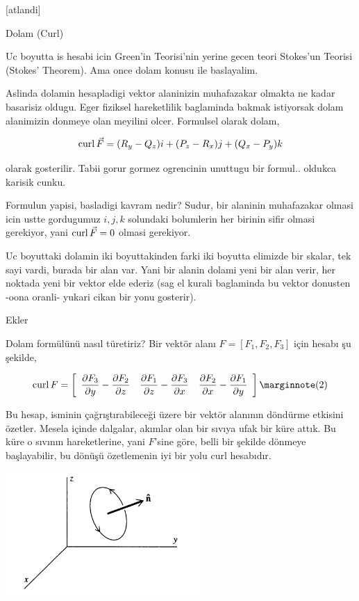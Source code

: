 \documentclass[12pt,fleqn]{article}\usepackage{../../common}
\begin{document}
[atlandi]

Dolam (Curl)

Uc boyutta is hesabi icin Green'in Teorisi'nin yerine gecen teori Stokes'un
Teorisi (Stokes' Theorem). Ama once dolam konusu ile baslayalim.

Aslinda dolamin hesapladigi vektor alaninizin muhafazakar olmakta ne kadar
basarisiz oldugu. Eger fiziksel hareketlilik baglaminda bakmak istiyorsak
dolam alanimizin donmeye olan meyilini olcer. Formulsel olarak dolam,

$$
\operatorname{curl} \vec{F} = (R_y - Q_z) i + (P_z - R_x) j + (Q_x - P_y) k
$$

olarak gosterilir. Tabii gorur gormez ogrencinin unuttugu bir formul..
oldukca karisik cunku.

Formulun yapisi, basladigi kavram nedir? Sudur, bir alaninin muhafazakar olmasi
icin ustte gordugumuz $i,j,k$ solundaki bolumlerin her birinin sifir olmasi
gerekiyor, yani $\operatorname{curl} \vec{F} = 0$ olmasi gerekiyor.

Uc boyuttaki dolamin iki boyuttakinden farki iki boyutta elimizde bir skalar,
tek sayi vardi, burada bir alan var. Yani bir alanin dolami yeni bir alan verir,
her noktada yeni bir vektor elde ederiz (sag el kurali baglaminda bu vektor
donusten -oona oranli- yukari cikan bir yonu gosterir). 













Ekler

Dolam formülünü nasıl türetiriz? Bir vektör alanı $F = [F_1,F_2,F_3]$ için
hesabı şu şekilde,

$$
\curl F = \left[\begin{array}{ccc} 
\dfrac{\partial F_3}{\partial y} - \dfrac{\partial F_2}{\partial z} & 
\dfrac{\partial F_1}{\partial z} - \dfrac{\partial F_3}{\partial x} & 
\dfrac{\partial F_2}{\partial x} - \dfrac{\partial F_1}{\partial y} 
\end{array}\right]
\mlabel{2}
$$

Bu hesap, isminin çağrıştırabileceği üzere bir vektör alanının döndürme etkisini
özetler. Mesela içinde dalgalar, akımlar olan bir sıvıya ufak bir küre attık. Bu
küre o sıvının hareketlerine, yani $F$'sine göre, belli bir şekilde dönmeye
başlayabilir, bu dönüşü özetlemenin iyi bir yolu curl hesabıdır.

\includegraphics[width=20em]{calc_multi_70_div_curl_lap_06.png}
\end{document}
